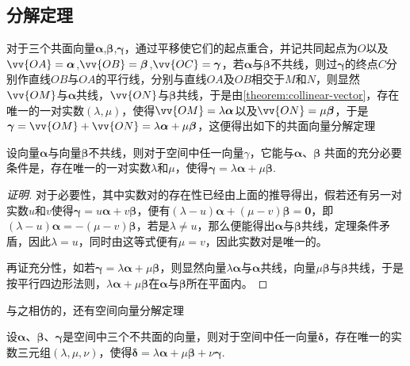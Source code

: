 \subsection{分解定理}
\label{sec:decompose-of-vector}
对于三个共面向量$\bm{\alpha}$,$\bm{\beta}$,$\bm{\gamma}$，通过平移使它们的起点重合，并记共同起点为$O$以及$\vv{OA}=\bm{\alpha}$,$\vv{OB}=\bm{\beta}$,$\vv{OC}=\bm{\gamma}$，若$\bm{\alpha}$与$\bm{\beta}$不共线，则过$\bm{\gamma}$的终点$C$分别作直线$OB$与$OA$的平行线，分别与直线$OA$及$OB$相交于$M$和$N$，则显然$\vv{OM}$与$\bm{\alpha}$共线，$\vv{ON}$与$\bm{\beta}$共线，于是由\autoref{theorem:collinear-vector}，存在唯一的一对实数$(\lambda,\mu)$，使得$\vv{OM}=\lambda \bm{\alpha}$以及$\vv{ON}=\mu \bm{\beta}$，于是$\bm{\gamma}=\vv{OM}+\vv{ON}=\lambda \bm{\alpha} + \mu \bm{\beta}$，这便得出如下的共面向量分解定理
\begin{theorem}[共面向量分解定理]
  \label{theorem:coplanar-vector}
 设向量$\bm{\alpha}$与向量$\bm{\beta}$不共线，则对于空间中任一向量$\gamma$，它能与$\bm{\alpha}$、$\bm{\beta}$ 共面的充分必要条件是，存在唯一的一对实数$\lambda$和$\mu$，使得$\bm{\gamma}=\lambda \bm{\alpha} + \mu \bm{\beta}$.
\end{theorem}

\begin{proof}[证明]
  对于必要性，其中实数对的存在性已经由上面的推导得出，假若还有另一对实数$u$和$v$使得$\bm{\gamma}=u \bm{\alpha} + v \bm{\beta}$，便有$(\lambda-u)\bm{\alpha}+(\mu-v)\bm{\beta}=\bm{0}$，即$(\lambda-u)\bm{\alpha}=-(\mu-v)\bm{\beta}$，若是$\lambda \neq u$，那么便能得出$\bm{\alpha}$与$\bm{\beta}$共线，定理条件矛盾，因此$\lambda=u$，同时由这等式便有$\mu=v$，因此实数对是唯一的。

  再证充分性，如若$\bm{\gamma}=\lambda \bm{\alpha} + \mu \bm{\beta}$，则显然向量$\lambda \bm{\alpha}$与$\bm{\alpha}$共线，向量$\mu \bm{\beta}$与$\bm{\beta}$共线，于是按平行四边形法则，$\lambda \bm{\alpha}+\mu \bm{\beta}$在$\bm{\alpha}$与$\bm{\beta}$所在平面内。
\end{proof}

与之相仿的，还有空间向量分解定理
\begin{theorem}[空间向量分解定理]
  \label{theorem:space-vector-decompose}
  设$\bm{\alpha}$、$\bm{\beta}$、$\bm{\gamma}$是空间中三个不共面的向量，则对于空间中任一向量$\bm{\delta}$，存在唯一的实数三元组$(\lambda, \mu, \nu)$，使得$\bm{\delta}=\lambda \bm{\alpha} + \mu \bm{\beta} + \nu \bm{\gamma}$.
\end{theorem}

